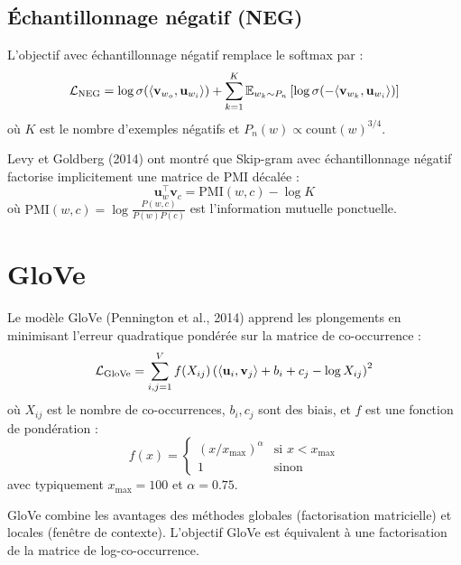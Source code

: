 \subsection{\'Echantillonnage n\'egatif (NEG)}

\begin{definition}
L'objectif avec \'echantillonnage n\'egatif remplace le softmax par :
\[
\mathcal{L}_{\text{NEG}} = \log \sigma(\langle \mathbf{v}_{w_o}, \mathbf{u}_{w_i} \rangle) + \sum_{k=1}^{K} \mathbb{E}_{w_k \sim P_n} \left[\log \sigma(-\langle \mathbf{v}_{w_k}, \mathbf{u}_{w_i} \rangle)\right]
\]
o\`u $K$ est le nombre d'exemples n\'egatifs et $P_n(w) \propto \text{count}(w)^{3/4}$.
\end{definition}

\begin{theoreme}
\label{thm:neg-pmi}
Levy et Goldberg (2014) ont montr\'e que Skip-gram avec \'echantillonnage
n\'egatif factorise implicitement une matrice de PMI d\'ecal\'ee :
\[
\mathbf{u}_w^\top \mathbf{v}_c = \text{PMI}(w, c) - \log K
\]
o\`u $\text{PMI}(w, c) = \log \frac{P(w, c)}{P(w) P(c)}$ est l'information
mutuelle ponctuelle.
\end{theoreme}

\section{GloVe}
\label{sec:plg:glove}

\begin{definition}[GloVe]
Le mod\`ele GloVe (Pennington et al., 2014) apprend les plongements en
minimisant l'erreur quadratique pond\'er\'ee sur la matrice de co-occurrence :
\[
\mathcal{L}_{\text{GloVe}} = \sum_{i,j=1}^{V} f(X_{ij}) \left(\langle \mathbf{u}_i, \mathbf{v}_j \rangle + b_i + c_j - \log X_{ij}\right)^2
\]
o\`u $X_{ij}$ est le nombre de co-occurrences, $b_i, c_j$ sont des biais, et
$f$ est une fonction de pond\'eration :
\[
f(x) = \begin{cases}
(x / x_{\max})^\alpha & \text{si } x < x_{\max} \\
1 & \text{sinon}
\end{cases}
\]
avec typiquement $x_{\max} = 100$ et $\alpha = 0.75$.
\end{definition}

\begin{remarque}
GloVe combine les avantages des m\'ethodes globales (factorisation matricielle)
et locales (fen\^etre de contexte). L'objectif GloVe est \'equivalent \`a une
factorisation de la matrice de log-co-occurrence.
\end{remarque}

